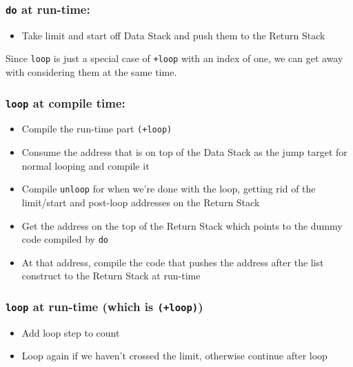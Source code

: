 \subsubsection{\texttt{do} at run-time:}

\begin{itemize}
        \item Take limit and start off Data Stack and push them to the Return Stack
\end{itemize}

\noindent Since \texttt{loop} is just a special case of \texttt{+loop} with an index of
one, we can get away with considering them at the same time. 


\subsubsection{\texttt{loop} at compile time:}

\begin{itemize}

        \item Compile the run-time part \texttt{(+loop)}

        \item Consume the address that is on top of the Data Stack as the jump
                target for normal looping and compile it

        \item Compile \texttt{unloop} for when we're done with the loop, getting
                rid of the limit/start and post-loop addresses on the Return
                Stack 

        \item  Get the address on the top of the Return Stack which points to
                the dummy code compiled by \texttt{do}

        \item At that address, compile the code that pushes the address after
                the list construct to the Return Stack at run-time

\end{itemize}

\subsubsection{\texttt{loop} at run-time (which is \texttt{(+loop)}) }

\begin{itemize}

        \item Add loop step to count

        \item Loop again if we haven't crossed the limit, otherwise continue
                after loop

\end{itemize}

